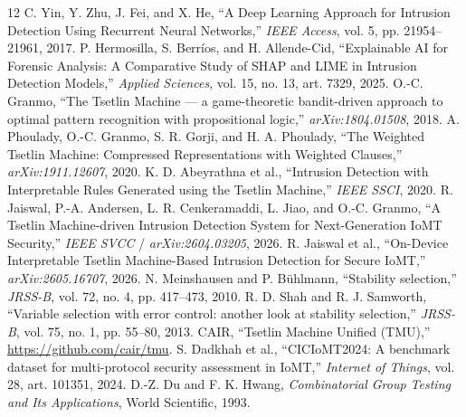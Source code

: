 \documentclass[conference]{IEEEtran}
\begin{document}
\endgroup

\clearpage

\begin{thebibliography}{12}
 C. Yin, Y. Zhu, J. Fei, and X. He,
``A Deep Learning Approach for Intrusion Detection Using Recurrent
Neural Networks,'' \emph{IEEE Access}, vol. 5, pp. 21954--21961, 2017.
 P. Hermosilla, S. Berr\'ios, and H. Allende-Cid,
``Explainable AI for Forensic Analysis: A Comparative Study of SHAP and
LIME in Intrusion Detection Models,'' \emph{Applied Sciences},
vol. 15, no. 13, art. 7329, 2025.
 O.-C. Granmo, ``The Tsetlin Machine --- a
game-theoretic bandit-driven approach to optimal pattern recognition with
propositional logic,'' \emph{arXiv:1804.01508}, 2018.
 A. Phoulady, O.-C. Granmo, S. R. Gorji, and H. A. Phoulady,
``The Weighted Tsetlin Machine: Compressed Representations with Weighted
Clauses,'' \emph{arXiv:1911.12607}, 2020.
 K. D. Abeyrathna et al., ``Intrusion Detection
with Interpretable Rules Generated using the Tsetlin Machine,'' \emph{IEEE
SSCI}, 2020.
 R. Jaiswal, P.-A. Andersen, L. R. Cenkeramaddi,
L. Jiao, and O.-C. Granmo, ``A Tsetlin Machine-driven Intrusion Detection
System for Next-Generation IoMT Security,'' \emph{IEEE SVCC} /
\emph{arXiv:2604.03205}, 2026.
 R. Jaiswal et al., ``On-Device Interpretable
Tsetlin Machine-Based Intrusion Detection for Secure IoMT,''
\emph{arXiv:2605.16707}, 2026.
 N. Meinshausen and P. B\"uhlmann, ``Stability
selection,'' \emph{JRSS-B}, vol. 72, no. 4, pp. 417--473, 2010.
 R. D. Shah and R. J. Samworth, ``Variable selection with error
control: another look at stability selection,'' \emph{JRSS-B}, vol. 75,
no. 1, pp. 55--80, 2013.
 CAIR, ``Tsetlin Machine Unified (TMU),'' \url{https://github.com/cair/tmu}.
 S. Dadkhah et al., ``CICIoMT2024: A benchmark dataset
for multi-protocol security assessment in IoMT,'' \emph{Internet of Things},
vol. 28, art. 101351, 2024.
 D.-Z. Du and F. K. Hwang, \emph{Combinatorial Group Testing
and Its Applications}, World Scientific, 1993.
\end{thebibliography}
\end{document}
